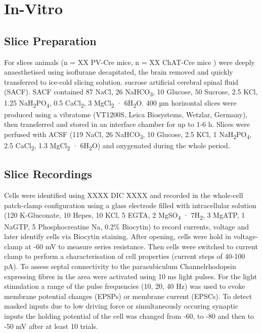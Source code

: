 \documentclass[
  12pt,
]{book}
\begin{document}
\hypertarget{in-vitro}{%
\section{In-Vitro}\label{in-vitro}}

\hypertarget{slice-preparation}{%
\subsection{Slice Preparation}\label{slice-preparation}}

For slices animals (n = XX PV-Cre mice, n = XX ChAT-Cre mice ) were deeply anaesthetised using isoflurane decapitated, the brain removed and quickly transferred to ice-cold slicing solution. sucrose artificial cerebral spinal fluid (SACF). SACF contained 87 NaCl, 26 NaHCO\textsubscript{3}, 10 Glucose, 50 Sucrose, 2.5 KCl, 1.25 NaH\textsubscript{2}PO\textsubscript{4}, 0.5 CaCl\textsubscript{2}, 3 MgCl\textsubscript{2} · 6H\textsubscript{2}O.
400 µm horizontal slices were produced using a vibratome (VT1200S, Leica Biosystems, Wetzlar, Germany), then transferred and stored in an interface chamber for up to 1-6 h. Slices were perfused with ACSF (119 NaCl, 26 NaHCO\textsubscript{3}, 10 Glucose, 2.5 KCl, 1 NaH\textsubscript{2}PO\textsubscript{4}, 2.5 CaCl\textsubscript{2}, 1.3 MgCl\textsubscript{2} · 6H\textsubscript{2}O) and oxygenated during the whole period.

\hypertarget{slice-recordings}{%
\subsection{Slice Recordings}\label{slice-recordings}}

Cells were identified using XXXX DIC XXXX and recorded in the whole-cell patch-clamp configuration using a glass electrode filled with intracellular solution (120 K-Gluconate, 10 Hepes, 10 KCl, 5 EGTA, 2 MgSO\textsubscript{4} · 7H\textsubscript{2}, 3 MgATP, 1 NaGTP, 5 Phosphocreatine Na, 0.2\% Biocytin) to record currents, voltage and later identify cells via Biocytin staining. After opening, cells were hold in voltage-clamp at -60 mV to measure series resistance. Then cells were switched to current clamp to perform a characterisation of cell properties (current steps of 40-100 pA). To assess septal connectivity to the parasubiculum Channelrhodopsin expressing fibres in the area were activated using 10 ms light pulses. For the light stimulation a range of the pulse frequencies (10, 20, 40 Hz) was used to evoke membrane potential changes (EPSPs) or membrane current (EPSCs). To detect masked inputs due to low driving force or simultaneously occuring synaptic inputs the holding potential of the cell was changed from -60, to -80 and then to -50 mV after at least 10 trials.
\end{document}
